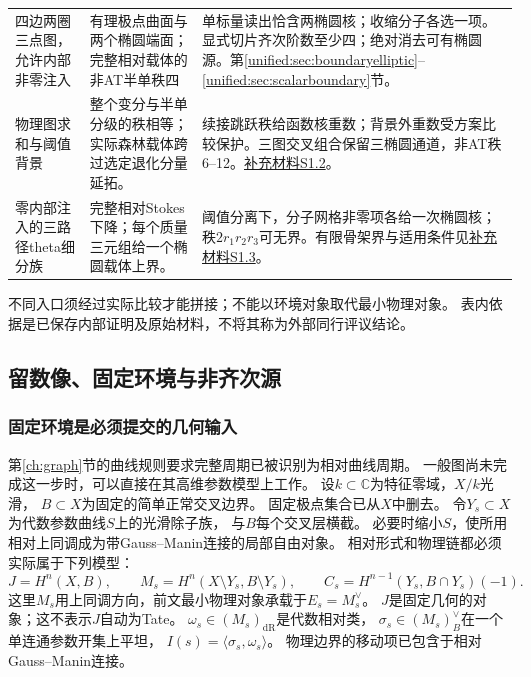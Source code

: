 \documentclass[11pt,a4paper,oneside]{ctexart}
\theoremstyle{cnplain}
\theoremstyle{definition}
\theoremstyle{remark}
\newcommand{\dR}{\mathrm{dR}}
\numberwithin{equation}{section}
\newcommand{\otherref}[2]{\href{#1.pdf}{#2}}
\begin{document}
\begin{center}
\begin{longtable}{>{\raggedright\arraybackslash}p{29mm}>{\raggedright\arraybackslash}p{51mm}>{\raggedright\arraybackslash}p{61mm}}
四边两圈三点图，允许内部非零注入 &
有理极点曲面与两个椭圆端面；完整相对载体的非AT半单秩四 &
单标量读出恰含两椭圆核；收缩分子各选一项。显式切片齐次阶数至少四；绝对消去可有椭圆源。第\ref{unified:sec:boundaryelliptic}--\ref{unified:sec:scalarboundary}节。\\
物理图求和与阈值背景&
整个变分与半单分级的秩相等；实际森林载体跨过选定退化分量延拓。&
续接跳跃秩给函数核重数；背景外重数受方案比较保护。三图交叉组合保留三椭圆通道，非AT秩6--12。\otherref{feynman_periods_supplement}{补充材料S1.2}。\\
零内部注入的三路径theta细分族&
完整相对Stokes下降；每个质量三元组给一个椭圆载体上界。&
阈值分离下，分子网格非零项各给一次椭圆核；秩$2r_1r_2r_3$可无界。有限骨架界与适用条件见\otherref{feynman_periods_supplement}{补充材料S1.3}。\\
\bottomrule
\end{longtable}
\end{center}
不同入口须经过实际比较才能拼接；不能以环境对象取代最小物理对象。
表内依据是已保存内部证明及原始材料，不将其称为外部同行评议结论。


\subsection{留数像、固定环境与非齐次源}
\label{unified:sec:pencil}
\subsubsection{固定环境是必须提交的几何输入}
第\ref{ch:graph}节的曲线规则要求完整周期已被识别为相对曲线周期。
一般图尚未完成这一步时，可以直接在其高维参数模型上工作。
设$k\subset\mathbb C$为特征零域，$X/k$光滑，
$B\subset X$为固定的简单正常交叉边界。
固定极点集合已从$X$中删去。
令$Y_s\subset X$为代数参数曲线$S$上的光滑除子族，
与$B$每个交叉层横截。
必要时缩小$S$，使所用相对上同调成为带Gauss--Manin连接的局部自由对象。
相对形式和物理链都必须实际属于下列模型：
\[
 J=H^n(X,B),\qquad
 M_s=H^n(X\setminus Y_s,B\setminus Y_s),\qquad
 C_s=H^{n-1}(Y_s,B\cap Y_s)(-1).
\]
这里$M_s$用上同调方向，前文最小物理对象承载于$E_s=M_s^\vee$。
$J$是固定几何的对象；这不表示$J$自动为Tate。
$\omega_s\in(M_s)_{\dR}$是代数相对类，
$\sigma_s\in(M_s)_B^\vee$在一个单连通参数开集上平坦，
$I(s)=\langle\sigma_s,\omega_s\rangle$。
物理边界的移动项已包含于相对Gauss--Manin连接。
\end{document}
